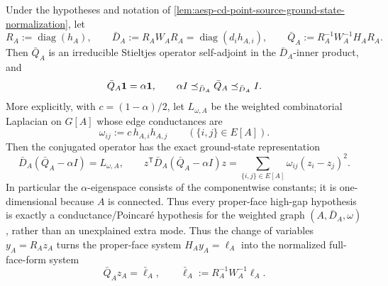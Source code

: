 \begin{proposition}
\label{prop:aesp-cd-proper-face-ground-conjugacy}
Under the hypotheses and notation of
\cref{lem:aesp-cd-point-source-ground-state-normalization}, let
\begin{equation*}
 R_A:=\operatorname{diag}(h_A),\qquad
 \bar D_A:=R_AW_AR_A=\operatorname{diag}(d_ih_{A,i}),
 \qquad
 \bar Q_A:=R_A^{-1}W_A^{-1}H_AR_A.
\end{equation*}
Then \(\bar Q_A\) is an irreducible Stieltjes operator self-adjoint in the
\(\bar D_A\)-inner product, and
\begin{equation}
 \bar Q_A\mathbf{1}=\alpha\mathbf{1},
 \qquad
 \alpha I\preceq_{\bar D_A}\bar Q_A\preceq_{\bar D_A}I.
 \label{eq:aesp-cd-proper-face-conjugate-spectrum}
\end{equation}
More explicitly, with \(c=(1-\alpha)/2\), let \(L_{\omega,A}\) be the
weighted combinatorial Laplacian on \(G[A]\) whose edge conductances are
\begin{equation*}
 \omega_{ij}:=c\,h_{A,i}h_{A,j}
 \qquad(\{i,j\}\in E[A]).
\end{equation*}
Then the conjugated operator has the exact ground-state representation
\begin{equation}
 \bar D_A(\bar Q_A-\alpha I)=L_{\omega,A},
 \qquad
 z^{\mathsf T}\bar D_A(\bar Q_A-\alpha I)z
 =\sum_{\{i,j\}\in E[A]}\omega_{ij}(z_i-z_j)^2.
 \label{eq:aesp-cd-proper-face-doob-laplacian}
\end{equation}
In particular the \(\alpha\)-eigenspace consists of the componentwise
constants; it is one-dimensional because \(A\) is connected.  Thus every
proper-face high-gap hypothesis is exactly a conductance/Poincar\'e
hypothesis for the weighted graph
\((A,\bar D_A,\omega)\), rather than an unexplained extra mode.
Thus the change of variables \(y_A=R_Az_A\) turns the proper-face system
\(H_Ay_A=\ell_A\) into the normalized full-face-form system
\begin{equation*}
 \bar Q_Az_A=\bar\ell_A,
 \qquad
 \bar\ell_A:=R_A^{-1}W_A^{-1}\ell_A.
\end{equation*}


\end{proposition}
